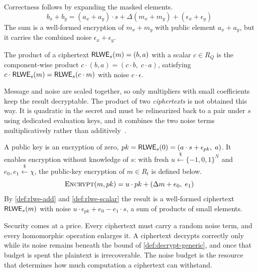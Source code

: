 Correctness follows by expanding the masked elements.
\begin{equation}
    b_x + b_y = (a_x + a_y) \cdot s + \Delta(m_x + m_y) + (\epsilon_x + \epsilon_y)
\end{equation}
The sum is a well-formed encryption of $m_x + m_y$ with public element $a_x + a_y$, but it carries the combined noise $\epsilon_x + \epsilon_y$.

\begin{definition}
    \label{def:rlwe-scalar}
    The product of a ciphertext $\mathsf{RLWE}_s(m) = (b, a)$ with a scalar $c \in R_Q$ is the component-wise product $c \cdot (b, a) = (c \cdot b,\; c \cdot a)$, satisfying $c \cdot \mathsf{RLWE}_s(m) = \mathsf{RLWE}_s(c \cdot m)$ with noise $c \cdot \epsilon$.
\end{definition}

Message and noise are scaled together, so only multipliers with small coefficients keep the result decryptable. The product of two \emph{ciphertexts} is not obtained this way. It is quadratic in the secret and must be relinearized back to a pair under $s$ using dedicated evaluation keys, and it combines the two noise terms multiplicatively rather than additively~\cite{cryptoeprint:2011/277}.

\begin{definition}
    \label{def:pk}
    A public key is an encryption of zero, $pk = \mathsf{RLWE}_s(0) = (a \cdot s + \epsilon_{pk},\; a)$. It enables encryption without knowledge of $s$: with fresh $u \overset{\$}{\leftarrow} \{-1, 0, 1\}^N$ and $e_0, e_1 \overset{\$}{\leftarrow} \chi$, the public-key encryption of $m \in R_t$ is defined below.
    \begin{equation}
        \label{eq:pk-encrypt}
        \Call{Encrypt}{m, pk} = u \cdot pk + (\Delta m + e_0,\; e_1)
    \end{equation}
    By \autoref{def:rlwe-add} and \autoref{def:rlwe-scalar} the result is a well-formed ciphertext $\mathsf{RLWE}_s(m)$ with noise $u \cdot \epsilon_{pk} + e_0 - e_1 \cdot s$, a sum of products of small elements.
\end{definition}

Security comes at a price. Every ciphertext must carry a random noise term, and every homomorphic operation enlarges it. A ciphertext decrypts correctly only while its noise remains beneath the bound of \autoref{def:decrypt-generic}, and once that budget is spent the plaintext is irrecoverable. The noise budget is the resource that determines how much computation a ciphertext can withstand.

